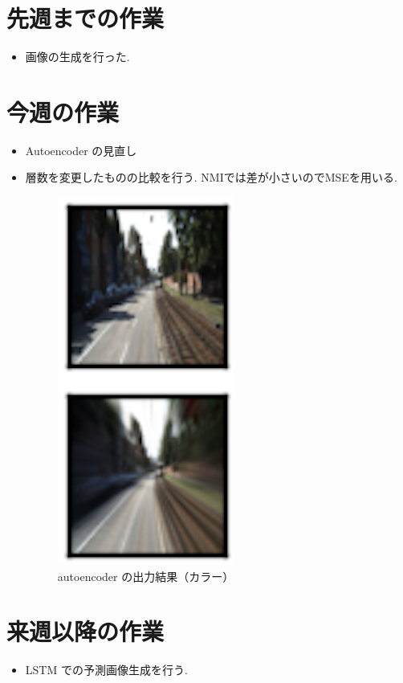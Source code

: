 \section{先週までの作業}
\begin{itemize}
          \item 画像の生成を行った.
\end{itemize}

\section{今週の作業}
\begin{itemize}
        \item Autoencoder の見直し
         \item 層数を変更したものの比較を行う. NMIでは差が小さいのでMSEを用いる.
\begin{figure}[hb]
\begin{center}
\includegraphics[scale=1.0]{autoencoder_2.png}
\caption{autoencoder の出力結果（カラー）}
\end{center}
\end{figure}
\end{itemize}

\section{来週以降の作業}
\begin{itemize}
         \item LSTM での予測画像生成を行う.
\end{itemize}





